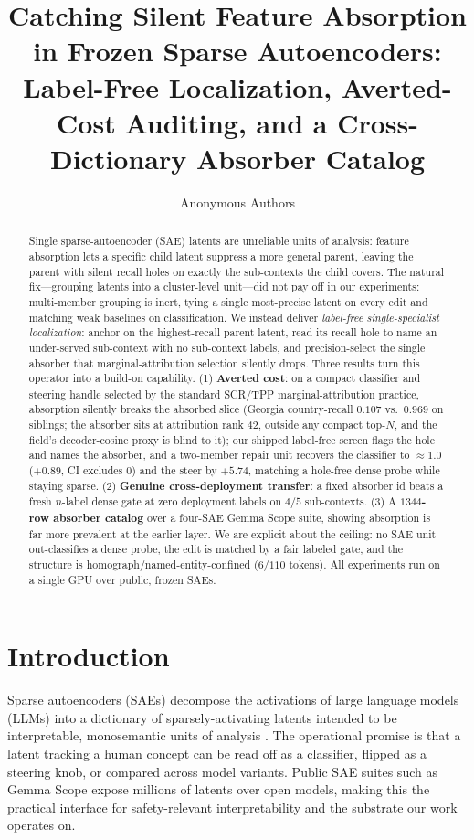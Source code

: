 \documentclass[11pt,letterpaper]{article}
\title{Catching Silent Feature Absorption in Frozen Sparse Autoencoders:
Label-Free Localization, Averted-Cost Auditing, and a Cross-Dictionary
Absorber Catalog}
\author{Anonymous Authors}
\date{}
\begin{document}
\maketitle

\begin{abstract}
Single sparse-autoencoder (SAE) latents are unreliable units of analysis: feature absorption lets a specific child latent suppress a more general parent, leaving the parent with silent recall holes on exactly the sub-contexts the child covers. The natural fix---grouping latents into a cluster-level unit---did not pay off in our experiments: multi-member grouping is inert, tying a single most-precise latent on every edit and matching weak baselines on classification. We instead deliver \emph{label-free single-specialist localization}: anchor on the highest-recall parent latent, read its recall hole to name an under-served sub-context with no sub-context labels, and precision-select the single absorber that marginal-attribution selection silently drops. Three results turn this operator into a build-on capability. (1) \textbf{Averted cost}: on a compact classifier and steering handle selected by the standard SCR/TPP marginal-attribution practice, absorption silently breaks the absorbed slice (Georgia country-recall $0.107$ vs.\ $0.969$ on siblings; the absorber sits at attribution rank $42$, outside any compact top-$N$, and the field's decoder-cosine proxy is blind to it); our shipped label-free screen flags the hole and names the absorber, and a two-member repair unit recovers the classifier to $\approx1.0$ ($+0.89$, CI excludes $0$) and the steer by $+5.74$, matching a hole-free dense probe while staying sparse. (2) \textbf{Genuine cross-deployment transfer}: a fixed absorber id beats a fresh $n$-label dense gate at zero deployment labels on $4/5$ sub-contexts. (3) A \textbf{$1344$-row absorber catalog} over a four-SAE Gemma Scope suite, showing absorption is far more prevalent at the earlier layer. We are explicit about the ceiling: no SAE unit out-classifies a dense probe, the edit is matched by a fair labeled gate, and the structure is homograph/named-entity-confined ($6/110$ tokens). All experiments run on a single GPU over public, frozen SAEs.
\end{abstract}

\section{Introduction}
\label{sec:intro}

Sparse autoencoders (SAEs) decompose the activations of large language models (LLMs) into a dictionary of sparsely-activating latents intended to be interpretable, monosemantic units of analysis \citep{Cunningham2023, Bricken2023, Templeton2024}. The operational promise is that a latent tracking a human concept can be read off as a classifier, flipped as a steering knob, or compared across model variants. Public SAE suites such as Gemma Scope \citep{Lieberum2024} expose millions of latents over open models, making this the practical interface for safety-relevant interpretability and the substrate our work operates on.
\end{document}
